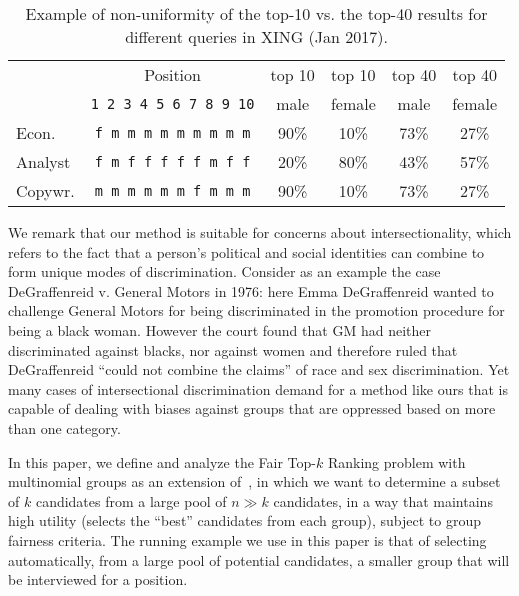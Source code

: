 \begin{table}[t]
	\caption{Example of non-uniformity of the top-10 vs. the top-40 results for different queries in XING (Jan 2017).
		\label{tbl:xing_intro_example}}

	\vspace{-3mm}

	\centering\small\begin{tabular}{lccccc}\toprule
		& Position					  & top 10 & top 10  & top 40 & top 40 \\
		& \texttt{1 2 3 4 5 6 7 8 9 10} & male & female & male & female \\
		\midrule
		Econ.  & \texttt{f m m m m m m m m m} & 90\% & 10\% & 73\% & 27\% \\
		Analyst& \texttt{f m f f f f f m f f} & 20\% & 80\% & 43\% & 57\% \\
		Copywr.& \texttt{m m m m m m f m m m} & 90\% & 10\% & 73\% & 27\% \\
		\bottomrule
	\end{tabular}

	\vspace{-2mm}
\end{table}
%
We remark that our method is suitable for concerns about intersectionality, which refers to the fact that a person's political and social identities can combine to form unique modes of discrimination.
%
Consider as an example the case DeGraffenreid v. General Motors in 1976: here Emma DeGraffenreid wanted to challenge General Motors for being discriminated in the promotion procedure for being a black woman.
%
However the court found that GM had neither discriminated against blacks, nor against women and therefore ruled that DeGraffenreid ``could not combine the claims'' of race and sex discrimination. 
%
Yet many cases of intersectional discrimination demand for a method like ours that is capable of dealing with biases against groups that are oppressed based on more than one category.

In this paper, we define and analyze the {\sc Fair Top-$k$ Ranking problem} with multinomial groups as an extension of~\cite{zehlike2017fair}, in which we want to determine a subset of $k$ candidates from a large pool of $n \gg k$ candidates, in a way that maintains high utility (selects the ``best'' candidates from each group), subject to group fairness criteria. 
%
The running example we use in this paper is that of selecting automatically, from a large pool of potential candidates, a smaller group that will be interviewed for a position.

